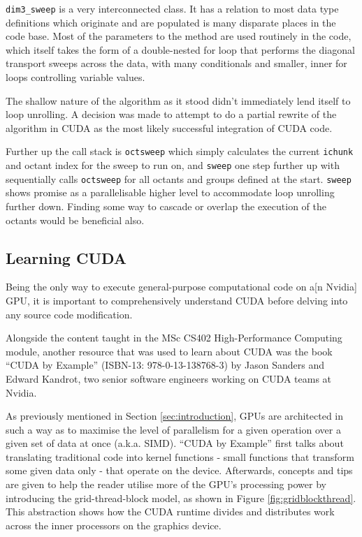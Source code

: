\documentclass[conference]{IEEEtran}
\begin{document}
\texttt{dim3\_sweep} is a very interconnected class. It has a relation to most data type definitions which originate and are populated is many disparate places in the code base. Most of the parameters to the method are used routinely in the code, which itself takes the form of a double-nested for loop that performs the diagonal transport sweeps across the data, with many conditionals and smaller, inner for loops controlling variable values.

The shallow nature of the algorithm as it stood didn't immediately lend itself to loop unrolling. A decision was made to attempt to do a partial rewrite of the algorithm in CUDA as the most likely successful integration of CUDA code.

Further up the call stack is \texttt{octsweep} which simply calculates the current \texttt{ichunk} and octant index for the sweep to run on, and \texttt{sweep} one step further up with sequentially calls \texttt{octsweep} for all octants and groups defined at the start. \texttt{sweep} shows promise as a parallelisable higher level to accommodate loop unrolling further down. Finding some way to cascade or overlap the execution of the octants would be beneficial also.

\subsection{Learning CUDA}
\label{subsec:inv_learningcuda}

Being the only way to execute general-purpose computational code on a[n Nvidia] GPU, it is important to comprehensively understand CUDA before delving into any source code modification.

Alongside the content taught in the MSc CS402 High-Performance Computing module, another resource that was used to learn about CUDA was the book ``CUDA by Example'' (ISBN-13: 978-0-13-138768-3) by Jason Sanders and Edward Kandrot\cite{sanders2010cuda}, two senior software engineers working on CUDA teams at Nvidia.

As previously mentioned in Section \ref{sec:introduction}, GPUs are architected in such a way as to maximise the level of parallelism for a given operation over a given set of data at once (a.k.a. SIMD). ``CUDA by Example'' first talks about translating traditional code into kernel functions - small functions that transform some given data only - that operate on the device. Afterwards, concepts and tips are given to help the reader utilise more of the GPU's processing power by introducing the grid-thread-block model, as shown in Figure \ref{fig:gridblockthread}. This abstraction shows how the CUDA runtime divides and distributes work across the inner processors on the graphics device.
\end{document}
